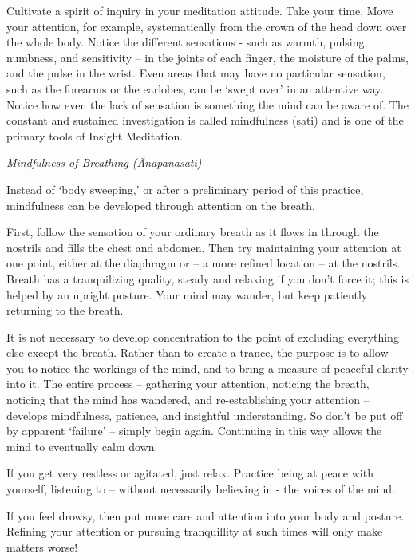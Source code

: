 Cultivate a spirit of inquiry in your meditation attitude. Take your
time. Move your attention, for example, systematically from the crown of
the head down over the whole body. Notice the different sensations -
such as warmth, pulsing, numbness, and sensitivity -- in the joints of
each finger, the moisture of the palms, and the pulse in the wrist. Even
areas that may have no particular sensation, such as the forearms or the
earlobes, can be `swept over' in an attentive way. Notice how even the
lack of sensation is something the mind can be aware of. The constant
and sustained investigation is called mindfulness (sati) and is one of
the primary tools of Insight Meditation.

\newpage

\emph{Mindfulness of Breathing (Ānāpānasati)}

Instead of `body sweeping,' or after a preliminary period of this
practice, mindfulness can be developed through attention on the breath.

First, follow the sensation of your ordinary breath as it flows in
through the nostrils and fills the chest and abdomen. Then try
maintaining your attention at one point, either at the diaphragm or -- a
more refined location -- at the nostrils. Breath has a tranquilizing
quality, steady and relaxing if you don't force it; this is helped by an
upright posture. Your mind may wander, but keep patiently returning to
the breath.

It is not necessary to develop concentration to the point of excluding
everything else except the breath. Rather than to create a trance, the
purpose is to allow you to notice the workings of the mind, and to bring
a measure of peaceful clarity into it. The entire process -- gathering
your attention, noticing the breath, noticing that the mind has
wandered, and re-establishing your attention -- develops mindfulness,
patience, and insightful understanding. So don't be put off by apparent
`failure' -- simply begin again. Continuing in this way allows the mind
to eventually calm down.

If you get very restless or agitated, just relax. Practice being at
peace with yourself, listening to -- without necessarily believing in -
the voices of the mind.

If you feel drowsy, then put more care and attention into your body and
posture. Refining your attention or pursuing tranquillity at such times
will only make matters worse!

